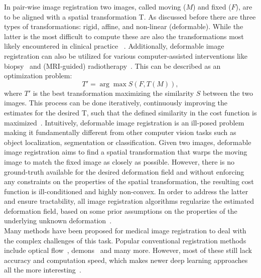 In pair-wise image registration two images, called moving ($M$) and fixed ($F$), are to be aligned with a spatial transformation T. As discussed before there are three types of transformations: rigid, affine, and non-linear (deformable). While the latter is the most difficult to compute these are also the transformations most likely encountered in clinical practice
~\cite{Zou2022}. Additionally, deformable image registration can also be
utilized for various computer-assisted interventions like biopsy~\cite{Tam2016} and (MRI-guided) radiotherapy~\cite{Chen2017, Rigaud2019}. This can be described as an optimization problem:
\begin{equation}
	T' = \arg\max S(F, T(M)),
\end{equation}
where $T'$ is the best transformation maximizing the similarity $S$ between the two images. This process can be done iteratively, continuously improving the estimates for the desired T, such that the defined similarity in the cost function is maximized~\cite{Chen2020}. Intuitively, deformable image registration is an ill-posed problem making it fundamentally different from other computer vision tasks such as object localization, segmentation or classification. Given two images, deformable image registration aims to find a spatial transformation that warps the moving image to match the fixed image as closely as possible. However, there is no ground-truth available for the desired deformation field and without enforcing any constraints on the properties of the spatial transformation, the resulting cost function is ill-conditioned and highly non-convex. In order to address the latter and ensure tractability, all image registration algorithms regularize the estimated deformation field, based on some prior assumptions on the properties of the underlying unknown deformation~\cite{Chen2020}.\\
Many methods have been proposed for medical image registration to deal with the complex challenges of this task. Popular conventional registration methods include optical flow~\cite{Yang2008}, demons~\cite{Vercauteren2009} and many more. However, most of these still lack accuracy and computation speed, which makes newer deep learning approaches all the more interesting~\cite{Fu2020}.


